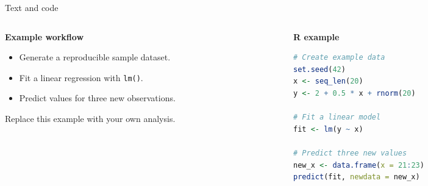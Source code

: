 \begin{frame}[t,fragile]{Text and code}
    \begin{columns}[T,onlytextwidth]
        \begin{column}{0.34\textwidth}
            \textbf{Example workflow}
            \begin{itemize}
                \item Generate a reproducible sample dataset.
                \item Fit a linear regression with \lstinline|lm()|.
                \item Predict values for three new observations.
            \end{itemize}
            \medskip
            Replace this example with your own analysis.
        \end{column}
        \begin{column}{0.62\textwidth}
            \textbf{R example}
\begin{lstlisting}[style=rcode,language=R]
# Create example data
set.seed(42)
x <- seq_len(20)
y <- 2 + 0.5 * x + rnorm(20)

# Fit a linear model
fit <- lm(y ~ x)

# Predict three new values
new_x <- data.frame(x = 21:23)
predict(fit, newdata = new_x)
\end{lstlisting}
        \end{column}
    \end{columns}
\end{frame}
